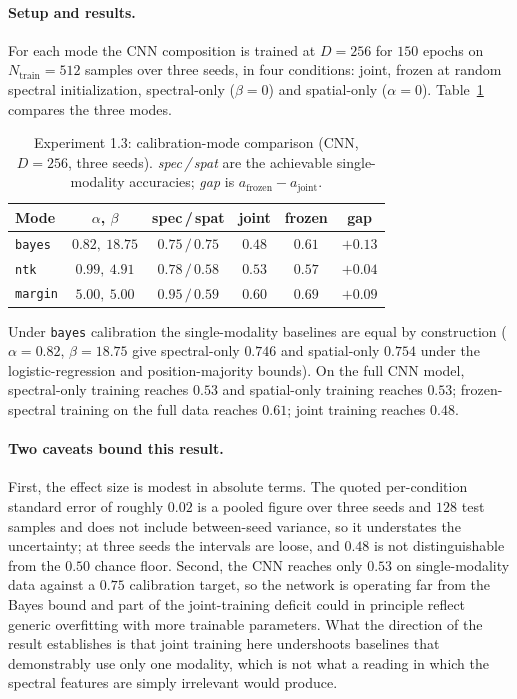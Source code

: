 \paragraph{Setup and results.} For each mode the CNN composition is trained at
$D = 256$ for $150$ epochs on $N_{\mathrm{train}} = 512$ samples over three
seeds, in four conditions: joint, frozen at random spectral initialization,
spectral-only ($\beta = 0$) and spatial-only ($\alpha = 0$).
Table~\ref{tab:app_calib} compares the three modes.

\begin{table}[htbp]
\centering
\caption{Experiment 1.3: calibration-mode comparison (CNN, $D = 256$, three
seeds). \emph{spec\,/\,spat} are the achievable single-modality accuracies;
\emph{gap} is $a_{\mathrm{frozen}} - a_{\mathrm{joint}}$.}
\label{tab:app_calib}
\begin{tabular}{lccccc}
\toprule
Mode & $\alpha$, $\beta$ & spec\,/\,spat & joint & frozen & gap \\
\midrule
\texttt{bayes}  & $0.82,\ 18.75$ & $0.75\,/\,0.75$ & $0.48$ & $0.61$ & $+0.13$ \\
\texttt{ntk}    & $0.99,\ 4.91$  & $0.78\,/\,0.58$ & $0.53$ & $0.57$ & $+0.04$ \\
\texttt{margin} & $5.00,\ 5.00$  & $0.95\,/\,0.59$ & $0.60$ & $0.69$ & $+0.09$ \\
\bottomrule
\end{tabular}
\end{table}

Under \texttt{bayes} calibration the single-modality baselines are equal by
construction ($\alpha = 0.82$, $\beta = 18.75$ give spectral-only $0.746$ and
spatial-only $0.754$ under the logistic-regression and position-majority
bounds). On the full CNN model, spectral-only training reaches $0.53$ and
spatial-only training reaches $0.53$; frozen-spectral training on the full data
reaches $0.61$; joint training reaches $0.48$.

\paragraph{Two caveats bound this result.} First, the effect size is modest in
absolute terms. The quoted per-condition standard error of roughly $0.02$ is a
pooled figure over three seeds and $128$ test samples and does not include
between-seed variance, so it understates the uncertainty; at three seeds the
intervals are loose, and $0.48$ is not distinguishable from the $0.50$ chance
floor. Second, the CNN reaches only $0.53$ on single-modality data against a
$0.75$ calibration target, so the network is operating far from the Bayes
bound and part of the joint-training deficit could in principle reflect
generic overfitting with more trainable parameters. What the direction of the
result establishes is that joint training here undershoots baselines that
demonstrably use only one modality, which is not what a reading in which the
spectral features are simply irrelevant would produce.

